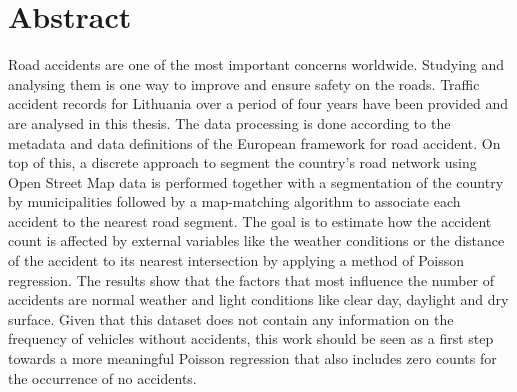 \chapter*{Abstract}
\begin{comment}
Sell your idea!
Make the reader want to stay with you!
Single paragraph, 100-200 words

Four parts/sentences
1. What's the problem
2. How did you solve it
3. What are the results
4. Conclusion (what it means for the future)
Make sure the abstract stands on its own!
-No reference tags
- Avoid acronyms

\end{comment}

Road accidents are one of the most important concerns worldwide. 
Studying and analysing them is one way to improve and ensure safety on the roads. 
Traffic accident records for Lithuania over a period of four years have been provided and are analysed in this thesis. 
The data processing is done according to the metadata and data definitions of the European framework for road accident. 
On top of this, a discrete approach to segment the country's road network using Open Street Map data is performed together with a segmentation of the country by municipalities followed by a map-matching algorithm to associate each accident to the nearest road segment. 
The goal is to estimate how the accident count is affected by external variables like the weather conditions or the distance of the accident to its nearest intersection by applying a method of Poisson regression. 
The results show that the factors that most influence the number of accidents are normal weather and light conditions like clear day, daylight and dry surface. 
Given that this dataset does not contain any information on the frequency of vehicles without accidents, this work should be seen as a first step towards a more meaningful Poisson regression that also includes zero counts for the occurrence of no accidents.
